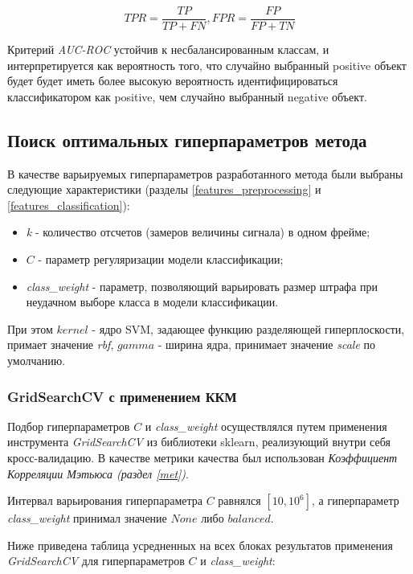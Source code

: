 \documentclass[utf8x, 14pt, oneside, a4paper]{article}
\begin{document}
	\begin{equation}
		TPR = \frac{TP}{TP + FN}, FPR = \frac{FP}{FP + TN}
	\end{equation}

	Критерий \textit{AUC-ROC} устойчив к несбалансированным классам, и интерпретируется как вероятность того, что случайно выбранный positive объект будет будет иметь более высокую вероятность идентифицироваться классификатором как positive, чем случайно выбранный negative объект.
	
	\subsection{Поиск оптимальных гиперпараметров метода}
	
	В качестве варьируемых гиперпараметров разработанного метода были выбраны следующие характеристики (разделы \ref{features_preprocessing} и \ref{features_classification}):
	\begin{itemize}
		\item \textit{k} - количество отсчетов (замеров величины сигнала) в одном фрейме;
		\item $C$ - параметр регуляризации модели классификации;
		\item \textit{class\_weight} - параметр, позволяющий варьировать размер штрафа при \linebreak неудачном выборе класса в модели классификации.
	\end{itemize}
	
	При этом $kernel$ - ядро SVM, задающее функцию разделяющей гиперплоскости, примает значение \textit{rbf}, $gamma$ - ширина ядра, принимает значение \textit{scale} по умолчанию.
	
	\subsubsection{GridSearchCV с применением ККМ}

	Подбор гиперпараметров $C$ и \textit{class\_weight} осуществлялся путем применения инструмента \textit{GridSearchCV} из библиотеки sklearn, реализующий внутри себя кросс-валидацию. В качестве метрики качества был использован \textit{Коэффициент Корреляции Мэтьюса (раздел \ref{met})}.
	
	Интервал варьирования гиперпараметра $C$ равнялся $[10, 10^6]$, а гиперпараметр \textit{class\_weight} принимал значение $None$ либо $balanced$.
	
	\newpage
	
	Ниже приведена таблица усредненных на всех блоках результатов применения \textit{GridSearchCV} для гиперпараметров $C$ и \textit{class\_weight}:
	
\end{document}
